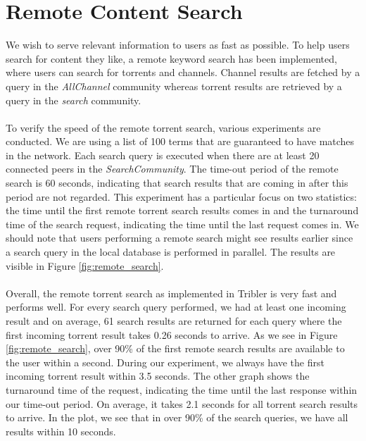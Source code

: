 \section{Remote Content Search}
We wish to serve relevant information to users as fast as possible. To help users search for content they like, a remote keyword search has been implemented, where users can search for torrents and channels. Channel results are fetched by a query in the \emph{AllChannel} community whereas torrent results are retrieved by a query in the \emph{search} community.\\\\
To verify the speed of the remote torrent search, various experiments are conducted. We are using a list of 100 terms that are guaranteed to have matches in the network. Each search query is executed when there are at least 20 connected peers in the \emph{SearchCommunity}. The time-out period of the remote search is 60 seconds, indicating that search results that are coming in after this period are not regarded. This experiment has a particular focus on two statistics: the time until the first remote torrent search results comes in and the turnaround time of the search request, indicating the time until the last request comes in. We should note that users performing a remote search might see results earlier since a search query in the local database is performed in parallel. The results are visible in Figure \ref{fig:remote_search}.\\\\
Overall, the remote torrent search as implemented in Tribler is very fast and performs well. For every search query performed, we had at least one incoming result and on average, 61 search results are returned for each query where the first incoming torrent result takes 0.26 seconds to arrive. As we see in Figure \ref{fig:remote_search}, over 90\% of the first remote search results are available to the user within a second. During our experiment, we always have the first incoming torrent result within 3.5 seconds. The other graph shows the turnaround time of the request, indicating the time until the last response within our time-out period. On average, it takes 2.1 seconds for all torrent search results to arrive. In the plot, we see that in over 90\% of the search queries, we have all results within 10 seconds.\\


